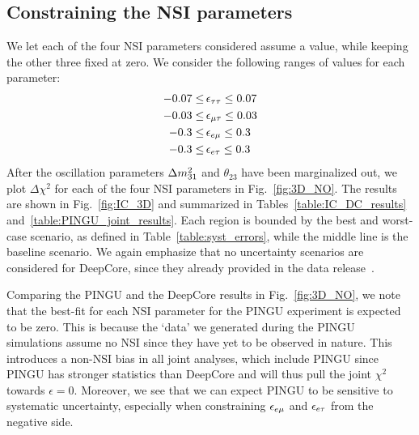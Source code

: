 {\subsection{Constraining the NSI parameters}\label{sec:constraining_NSI}
We let each of the four NSI parameters considered assume a value, while keeping the other three fixed at zero. We consider the following ranges of values for each parameter:
\begin{align}
   -0.07 \le &\, \epsilon_{\tau\tau} \le 0.07 \nonumber \\
   -0.03 \le &\, \epsilon_{\mu\tau} \le 0.03 \nonumber \\
   -0.3 \le &\, \epsilon_{e\mu} \le 0.3 \nonumber \\
   -0.3 \le &\, \epsilon_{e\tau} \le 0.3 \nonumber \\
\end{align}
After the oscillation parameters $\dm[31]$ and $\theta_{23}$ have been marginalized out, we plot $\Delta \chi^2$ for each of the four NSI parameters in Fig.~\ref{fig:3D_NO}. 
The results are shown in Fig.~\ref{fig:IC_3D} and summarized in Tables~\ref{table:IC_DC_results} and~\ref{table:PINGU_joint_results}. Each region is bounded
by the best and worst-case scenario, as defined in Table~\ref{table:syst_errors}, while the middle line is the baseline scenario. We again emphasize that 
no uncertainty scenarios are considered for DeepCore, since they already provided in the data release~\cite{DC2019data}.

Comparing the PINGU and the DeepCore results in Fig.~\ref{fig:3D_NO}, we note that the best-fit for each NSI parameter for the PINGU experiment is expected to be zero. This is because the `data' we generated during 
the PINGU simulations assume no NSI since they have yet to be observed in nature. This introduces a non-NSI bias in all joint analyses, which include PINGU
since PINGU has stronger statistics than DeepCore and will thus pull the joint $\chi^2$ towards $\epsilon =0$.
Moreover, we see that we can expect PINGU to be sensitive to systematic uncertainty, especially when constraining $\epsilon_{e\mu}$ and $\epsilon_{e\tau}$ from the negative side.

}
